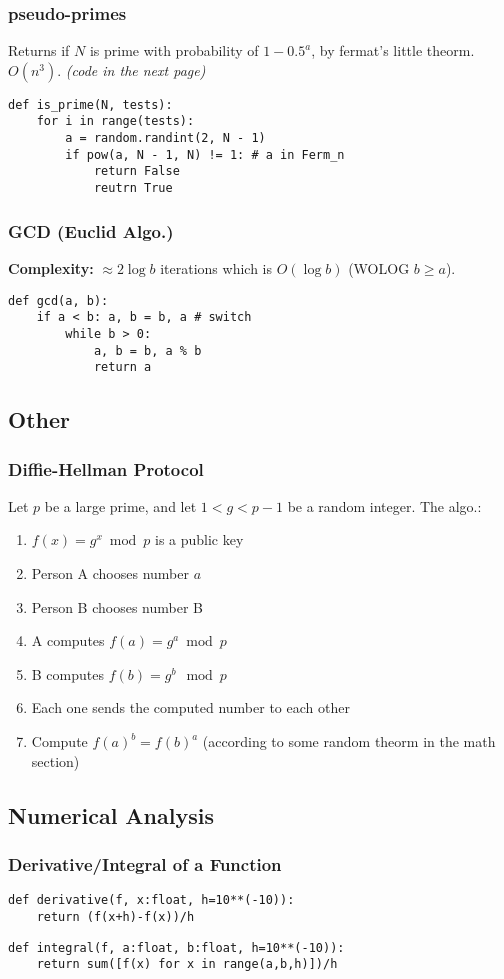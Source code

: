 \documentclass[]{article}
\begin{document}
\begin{multicols}{2}
		\subsubsection{pseudo-primes}
		Returns if $ N $ is prime with probability of $ 1 - 0.5^{a} $, by fermat's little theorm. $O(n^3)$. \textit{(code in the next page)}
		\pagebreak
		\begin{lstlisting}
def is_prime(N, tests): 
	for i in range(tests): 
		a = random.randint(2, N - 1)
		if pow(a, N - 1, N) != 1: # a in Ferm_n
			return False
			reutrn True\end{lstlisting}
		\subsubsection{GCD (Euclid Algo.)}
		\textbf{Complexity: }$ \approx 2 \log b $ iterations which is $ O(\log b) $ (WOLOG $ b \ge a $). 
		\begin{lstlisting}
def gcd(a, b): 
	if a < b: a, b = b, a # switch
		while b > 0: 
			a, b = b, a % b
			return a\end{lstlisting}
		
		\subsection{Other}
		\subsubsection{Diffie-Hellman Protocol}
		Let $ p $ be a large prime, and let $ 1 < g < p - 1 $ be a random integer. The algo.: 
		\begin{enumerate}
			\item $ f(x) = g^x \bmod p $ is a public key
			\item Person A chooses number $ a $
			\item Person B chooses number B
			\item A computes $ f(a) = g^a \bmod p $
			\item B computes $ f(b) = g^b \mod p $
			\item Each one sends the computed number to each other
			\item Compute $ f(a)^b = f(b)^a $ (according to some random theorm in the math section) 
		\end{enumerate}
		\subsection{Numerical Analysis}
		\subsubsection*{Derivative/Integral of a Function}
		\begin{lstlisting}
def derivative(f, x:float, h=10**(-10)):
	return (f(x+h)-f(x))/h
\end{lstlisting}
		\begin{lstlisting}
def integral(f, a:float, b:float, h=10**(-10)):
	return sum([f(x) for x in range(a,b,h)])/h
\end{lstlisting}

\end{multicols}
\end{document}
